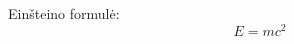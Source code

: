 \documentclass[12pt]{article}
\begin{document}
\usepackage{fontspec}
Einšteino formulė:
\begin{equation}
E=mc^2
\end{equation}
\end{document}
